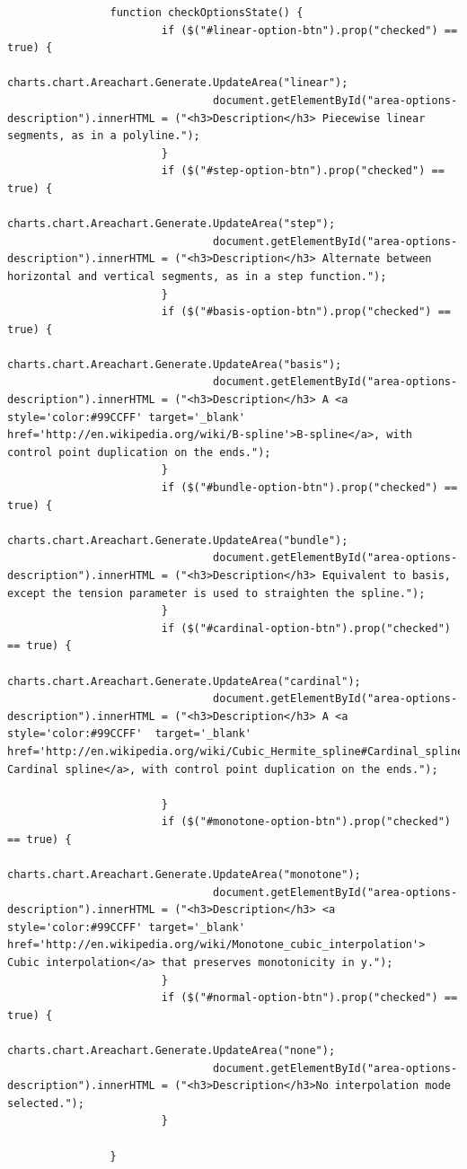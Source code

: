 \begin{lstlisting}
                function checkOptionsState() {
                        if ($("#linear-option-btn").prop("checked") == true) {
                                charts.chart.Areachart.Generate.UpdateArea("linear");
                                document.getElementById("area-options-description").innerHTML = ("<h3>Description</h3> Piecewise linear segments, as in a polyline.");
                        }
                        if ($("#step-option-btn").prop("checked") == true) {
                                charts.chart.Areachart.Generate.UpdateArea("step");
                                document.getElementById("area-options-description").innerHTML = ("<h3>Description</h3> Alternate between horizontal and vertical segments, as in a step function.");
                        }
                        if ($("#basis-option-btn").prop("checked") == true) {
                                charts.chart.Areachart.Generate.UpdateArea("basis");
                                document.getElementById("area-options-description").innerHTML = ("<h3>Description</h3> A <a style='color:#99CCFF' target='_blank' href='http://en.wikipedia.org/wiki/B-spline'>B-spline</a>, with control point duplication on the ends.");
                        }
                        if ($("#bundle-option-btn").prop("checked") == true) {
                                charts.chart.Areachart.Generate.UpdateArea("bundle");
                                document.getElementById("area-options-description").innerHTML = ("<h3>Description</h3> Equivalent to basis, except the tension parameter is used to straighten the spline.");
                        }
                        if ($("#cardinal-option-btn").prop("checked") == true) {
                                charts.chart.Areachart.Generate.UpdateArea("cardinal");
                                document.getElementById("area-options-description").innerHTML = ("<h3>Description</h3> A <a style='color:#99CCFF'  target='_blank' href='http://en.wikipedia.org/wiki/Cubic_Hermite_spline#Cardinal_spline'> Cardinal spline</a>, with control point duplication on the ends.");

                        }
                        if ($("#monotone-option-btn").prop("checked") == true) {
                                charts.chart.Areachart.Generate.UpdateArea("monotone");
                                document.getElementById("area-options-description").innerHTML = ("<h3>Description</h3> <a style='color:#99CCFF' target='_blank' href='http://en.wikipedia.org/wiki/Monotone_cubic_interpolation'> Cubic interpolation</a> that preserves monotonicity in y.");
                        }
                        if ($("#normal-option-btn").prop("checked") == true) {
                                charts.chart.Areachart.Generate.UpdateArea("none");
                                document.getElementById("area-options-description").innerHTML = ("<h3>Description</h3>No interpolation mode selected.");
                        }

                }
\end{lstlisting}

